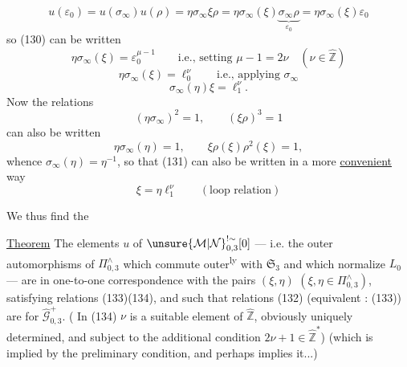  \deleted{$\unsure{\eta\sigma_\infty}$}
\[
u(\varepsilon_0)=u(\sigma_\infty)u(\rho)
=\eta\sigma_\infty\xi\rho
=\eta\sigma_\infty(\xi)\underbrace{\sigma_\infty\rho}_{\varepsilon_0}
=\eta\sigma_\infty(\xi)\varepsilon_0
\]
so (130) can be written
\[
\eta\sigma_\infty(\xi)=\varepsilon_0^{\mu-1}
\qquad\text{i.e., setting }\mu-1=2\nu
\quad(\nu\in\widehat{\mathbb Z})
\]
\[
\eta\sigma_\infty(\xi)=\ell_0^\nu
\qquad\text{i.e., applying }\sigma_\infty
\]
\[
\tag{131}
\sigma_\infty(\eta)\xi=\ell_1^\nu.
\]
Now the relations
\[
\tag{132}
(\eta\sigma_\infty)^2=1,\qquad(\xi\rho)^3=1
\]
can also be written
\[
\tag{133}
\boxed{\eta\sigma_\infty(\eta)=1,\qquad
\xi\rho(\xi)\rho^2(\xi)=1},
\]
whence $\sigma_\infty(\eta)=\eta^{-1}$, so that (131) can
also be written in a more \uline{convenient} way
\[
\tag{134}
\boxed{\xi=\eta\ell_1^\nu}
\qquad(\text{loop relation})
\]


We thus find the

\uline{Theorem} The elements $u$ of
$\unsure{\mathcal M|\mathcal N}_{0,3}^{!\sim}[0]$ --- i.e. the
outer automorphisms of $\Pi_{0,3}^{\wedge}$ which commute outer\textsuperscript{ly}
with $\mathfrak S_3$ and which normalize $L_0$ --- are in one-to-one
correspondence 
with the pairs $(\xi,\eta)$ $(\xi,\eta\in\Pi_{0,3}^{\wedge})$,
satisfying relations (133)(134), and such that
relations (132) (equivalent : (133)) are
for $\widehat{\mathcal G}_{0,3}^{+}$.
( In (134) $\nu$ is a suitable element of
$\widehat{\mathbb Z}$, obviously uniquely determined, and subject
to the additional condition $2\nu+1\in\widehat{\mathbb Z}^{*}$)
(which is implied by the preliminary condition, and perhaps implies it...)


